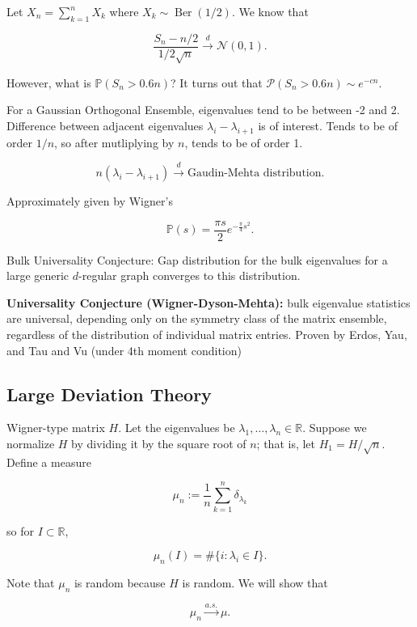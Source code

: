 \begin{example}

Let \(X_n = \sum_{k=1}^n X_k\) where \(X_k \sim \operatorname{Ber}(1/2)\). We know that 

\[
\frac{S_n - n/2}{1/2 \sqrt{n}} \xrightarrow{d} \mathcal{N}(0,1).
\]

However, what is \(\mathbb{P}(S_n > 0.6n)\)? It turns out that \(\mathcal{P}(S_n > 0.6n) \sim e^{-cn}\).

\end{example}

For a Gaussian Orthogonal Ensemble, eigenvalues tend to be between -2 and 2. Difference between adjacent eigenvalues \(\lambda_i - \lambda_{i+1}\) is of interest. Tends to be of order \(1/n\), so after mutliplying by \(n\), tends to be of order 1. 

\[
n(\lambda_i - \lambda_{i+1}) \xrightarrow{d} \text{Gaudin-Mehta distribution.}
\]

Approximately given by Wigner's 

\[
\mathbb{P}(s) = \frac{\pi s}{2}e^{-\frac{\pi}{4} s^2}.
\]

Bulk Universality Conjecture: Gap distribution for the bulk eigenvalues for a large generic \(d\)-regular graph converges to this distribution.

\textbf{Universality Conjecture (Wigner-Dyson-Mehta):} bulk eigenvalue statistics are universal, depending only on the symmetry class of the matrix ensemble, regardless of the distribution of individual matrix entries. Proven by Erdos, Yau, and Tau and Vu (under 4th moment condition)

\subsection{Large Deviation Theory}


Wigner-type matrix \(H\). Let the eigenvalues be \(\lambda_1, \ldots, \lambda_n \in \mathbb{R}\). Suppose we normalize \(H\) by dividing it by the square root of \(n\); that is, let \(H_1 = H/\sqrt{n}\). Define a measure

\[
\mu_n := \frac{1}{n} \sum_{k=1}^n \delta_{\lambda_k} 
\]

so for \(I \subset \mathbb{R}\), 

\[
\mu_n(I) = \# \{i : \lambda_i \in I\}.
\]

Note that \(\mu_n\) is random because \(H\) is random. We will show that

\[
\mu_n \xrightarrow{a.s.} \mu.
\]


